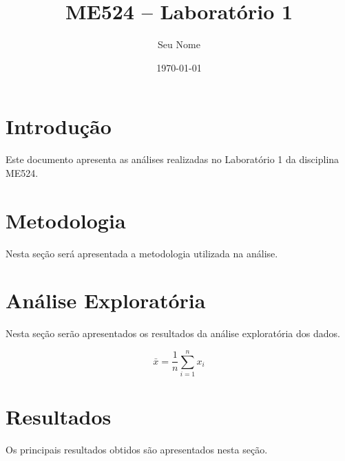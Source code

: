 \documentclass[12pt,a4paper]{article}
\title{ME524 -- Laboratório 1}
\author{Seu Nome}
\date{\today}
\begin{document}
\maketitle

\tableofcontents
\newpage

\section{Introdução}

Este documento apresenta as análises realizadas no Laboratório 1
da disciplina ME524.

\section{Metodologia}

Nesta seção será apresentada a metodologia utilizada na análise.

\section{Análise Exploratória}

Nesta seção serão apresentados os resultados da análise exploratória
dos dados.

\begin{equation}
    \bar{x} = \frac{1}{n}\sum_{i=1}^{n}x_i
\end{equation}

\section{Resultados}

Os principais resultados obtidos são apresentados nesta seção.

%
\end{document}
